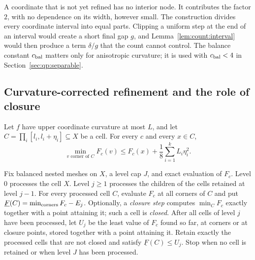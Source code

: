 A coordinate that is not yet refined has no interior node. It contributes
the factor $2$, with no dependence on its width, however small. The
construction divides every coordinate interval into equal parts. Clipping a
uniform step at the end of an interval would create a short final gap $g$,
and Lemma~\ref{lem:count:interval} would then produce a term $\delta/g$ that
the count cannot control. The balance constant $c_{\rm bal}$ matters only
for anisotropic curvature; it is used with $c_{\rm bal}<4$ in
Section~\ref{sec:qp:separable}.

\subsection{Curvature-corrected refinement and the role of closure}\label{sec:count:search}

\begin{lemma}\label{lem:count:rounding}
Let $f$ have upper coordinate curvature at most $L$, and let
$C=\prod_i[l_i,l_i+\eta_i]\subseteq X$ be a cell. For every $c$ and every
$x\in C$,
\[
 \min_{v\text{ corner of }C}F_c(v)\le F_c(x)+\frac18\sum_{i=1}^kL_i\eta_i^2 .
\]
\end{lemma}

\begin{definition}\label{def:count:search}
Fix balanced nested meshes on $X$, a level cap $J$, and exact evaluation of
$F_c$. Level $0$ processes the cell $X$. Level $j\ge1$ processes the
children of the cells retained at level $j-1$. For every processed cell $C$,
evaluate $F_c$ at all corners of $C$ and put
$\underline F(C)=\min_{\rm corners}F_c-E_j$. Optionally, a \emph{closure
step} computes $\min_CF_c$ exactly together with a point attaining it; such
a cell is \emph{closed}. After all cells of level $j$ have been processed,
let $U_j$ be the least value of $F_c$ found so far, at corners or at closure
points, stored together with a point attaining it. Retain exactly the
processed cells that are not closed and satisfy $\underline F(C)\le U_j$.
Stop when no cell is retained or when level $J$ has been processed.
\end{definition}

